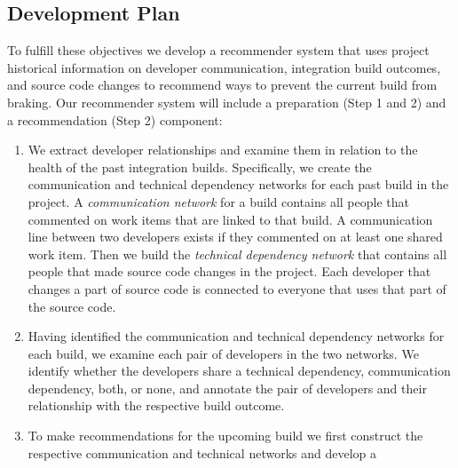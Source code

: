\documentclass{sig-alternate}
\begin{document}
\pagebreak
\subsection{Development Plan}
To fulfill these objectives we develop a recommender system that uses project
historical information on developer communication, integration build outcomes,
and source code changes to recommend ways to prevent the current build from
braking. Our recommender system will include a preparation (Step 1 and 2) and a recommendation (Step 2) component:\vspace{-0pt}
\begin{enumerate}
\item We extract developer relationships and examine
them in relation to the health of the past integration builds. Specifically, we
create the communication and technical dependency networks for each past build
in the project. A \emph{communication network} for a build contains all people
that commented on work items that are linked to that build. A communication
line between two developers exists if they commented on at least one shared
work item. Then we build the \emph{technical dependency network} that contains
all people that made source code changes in the project. Each developer that
changes a part of source code is connected to everyone that uses that
part of the source code.
\vspace{-3pt}
\item  Having identified the communication and technical dependency networks for
each build, we examine each pair of developers in the two networks. We identify
whether the developers share a technical dependency, communication dependency,
both, or none, and annotate the pair of developers and their relationship with
the respective build outcome.
\vspace{-3pt}
\item To make recommendations for the upcoming build we first construct
the respective communication and technical networks and develop a

\end{enumerate}
\end{document}
